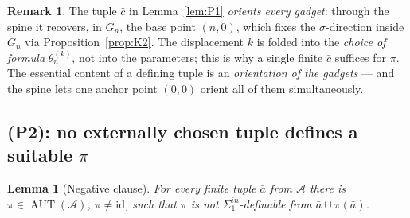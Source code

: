 \documentclass[12pt,fullpage]{article}
\newtheorem{lemma}[theorem]{Lemma}
\theoremstyle{definition}
\newtheorem{remark}[theorem]{Remark}
\newcommand{\A}{\mathcal{A}}
\newcommand{\AUT}{\operatorname{AUT}}
\begin{document}
\begin{remark}\label{rem:per-pi}
The tuple $\bar c$ in Lemma~\ref{lem:P1} \emph{orients every gadget}: through
the spine it recovers, in $G_n$, the base point $(n,0)$, which fixes the
$\sigma$-direction inside $G_n$ via Proposition~\ref{prop:K2}.  The
displacement $k$ is folded into the \emph{choice of formula}
$\theta_n^{(k)}$, not into the parameters; this is why a single finite
$\bar c$ suffices for $\pi$.  The essential content of a defining tuple is an
\emph{orientation of the gadgets} --- and the spine lets one anchor point
$(0,0)$ orient all of them simultaneously.
\end{remark}

\subsection*{(P2): no externally chosen tuple defines a suitable $\pi$}

\begin{lemma}[Negative clause]\label{lem:P2}
For every finite tuple $\bar a$ from $\A$ there is $\pi\in\AUT(\A)$,
$\pi\neq\mathrm{id}$, such that $\pi$ is \emph{not} $\Sigma^{in}_1$-definable
from $\bar a\cup\pi(\bar a)$.
\end{lemma}
\end{document}
